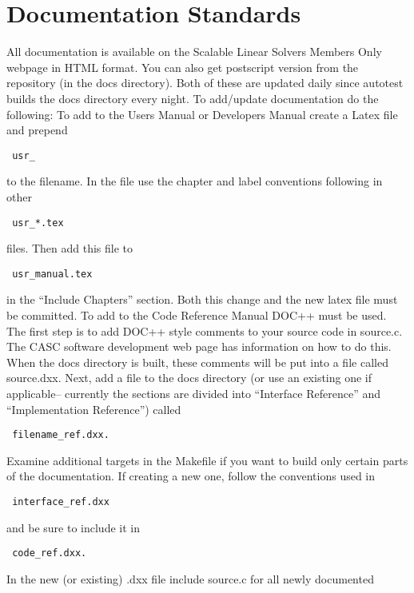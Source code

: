\chapter{Documentation Standards}
\label{Documentation Standards}

All documentation is available on the Scalable Linear Solvers Members Only
webpage in HTML format.  You can also get postscript version from the
repository (in the docs directory).  Both of these are updated daily since
autotest builds the docs directory every night. 
\newline
To add/update documentation do the following:
\newline
To add to the Users Manual or Developers Manual create a Latex file and prepend
\begin{verbatim} usr_ \end{verbatim}
to the filename.  In the file use the chapter and label conventions following
in other
\begin{verbatim} usr_*.tex \end{verbatim} 
files.  Then add this file to 
\begin{verbatim} usr_manual.tex \end{verbatim} 
in the ``Include Chapters'' section.  Both this change and the new latex file
must be committed.
\newline\newline To add to the Code Reference Manual DOC++ must be used.  The
first step is to add DOC++ style comments to your source code in source.c.  The
CASC software development web page has information on how to do this.  When the
docs directory is built, these comments will be put into a file called
source.dxx.  Next, add a file to the docs directory (or use an existing one if
applicable-- currently the sections are divided into ``Interface Reference''
and ``Implementation Reference'') called
\begin{verbatim} filename_ref.dxx. \end{verbatim} 
Examine additional targets in the Makefile if you want to build only certain
parts of the documentation.  If creating a new one, follow the conventions used
in
\begin{verbatim} interface_ref.dxx \end{verbatim} and be sure to include it
in
\begin{verbatim} code_ref.dxx. \end{verbatim}  
In the new (or existing) .dxx file include source.c for all newly documented

